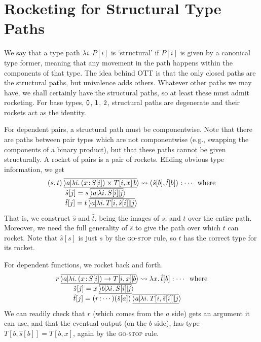 \documentclass{sigplanconf}
\newcommand{\hb}{\!:\!}
\begin{document}
\section{Rocketing for Structural Type Paths}

We say that a type path $\lambda i.\,P[i]$ is `structural' if $P[i]$
is given by a canonical type former, meaning that any movement in the
path happens within the components of that type.  The idea behind OTT
is that the only closed paths are the structural paths, but univalence
adds others. Whatever other paths we may have, we shall certainly have
the structural paths, so at least these must admit rocketing. For base
types, $\mathsf{0}$, $\mathsf{1}$, $2$, structural paths are degenerate and
their rockets act as the identity.

For dependent pairs, a structural path must be componentwise. Note
that there are paths between pair types which are not componentwise
(e.g., swapping the components of a binary product), but that these
paths cannot be given structurally. A rocket of pairs is a pair of
rockets. Eliding obvious type information, we get
\[\begin{array}{l}
\xp{(s,t)}a{\lambda i.\,(x\hb S[i])\times T[i,x]}b \leadsto
  (\hat s[b], \hat t[b]):\cdots\;\;\textrm{where} \\
\qquad\begin{array}{l}
  \hat s[j]= \xp s a {\lambda i.\,S[i]} j \\
  \hat t[j]= \xp t a {\lambda i.\,T[i,\hat s[i]]} j \\
\end{array}
\end{array}\]
That is, we construct $\hat s$ and $\hat t$, being the images of $s$,
and $t$ over the entire path. Moreover, we need the full generality of
$\hat s$ to give the path over which $t$ can rocket. Note that $\hat
s[s]$ is just $s$ by the \textsc{go-stop} rule, so $t$ has the
correct type for its rocket.

For dependent functions, we rocket back and forth.
\[\begin{array}{l}
\xp{r}a{\lambda i.\,(x\hb S[i])\to T[i,x]}b \leadsto
  \lambda x.\, \hat t[b]:\cdots\;\;\textrm{where} \\
\qquad\begin{array}{l}
  \hat s[j]= \xp x b {\lambda i.\,S[i]} j \\
  \hat t[j]= \xp {(r\hb\cdots) (\hat s[a])} a {\lambda i.\,T[i,\hat s[i]]} j \\
\end{array}
\end{array}\]
We can readily check that $r$ (which comes from the $a$ side) gets an
argument it can use, and that the eventual output (on the $b$ side),
has type $T[b,\hat s[b]] = T[b,x]$, again by the \textsc{go-stop} rule.
\end{document}
